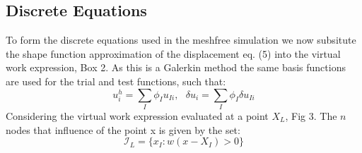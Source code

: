 \subsection*{Discrete Equations}
To form the discrete equations used in the meshfree simulation we now subsitute the shape function approximation of the displacement eq. (5) into the virtual work expression, Box 2. As this is a Galerkin method the same basis functions are used for the trial and test functions, such that:
\begin{equation}
u_i^h = \sum_I \phi_I u_{Ii} , ~~~ \delta u_i = \sum_I \phi_I \delta u_{Ii}
\end{equation}
Considering the virtual work expression evaluated at a point $X_L$, Fig 3. The $n$ nodes that influence of the point x is given by the set:
\begin{equation}
\mathcal{I}_L = \{x_I : w(x-X_I) > 0 \}
\end{equation}


